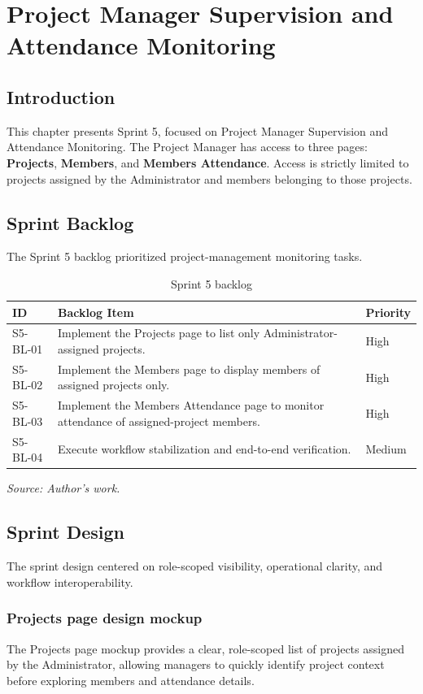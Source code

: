 \chapter{Project Manager Supervision and Attendance Monitoring}
\minitoc
\clearpage
\section{Introduction}
This chapter presents Sprint 5, focused on Project Manager Supervision and Attendance Monitoring. The Project Manager has access to three pages: \textbf{Projects}, \textbf{Members}, and \textbf{Members Attendance}. Access is strictly limited to projects assigned by the Administrator and members belonging to those projects.

\section{Sprint Backlog}
The Sprint 5 backlog prioritized project-management monitoring tasks.
\begin{table}[H]
\centering
\renewcommand{\arraystretch}{1.2}
\begin{tabular}{|l|>{\raggedright\arraybackslash}p{10.2cm}|l|}
\hline
\textbf{ID} & \textbf{Backlog Item} & \textbf{Priority} \\
\hline
S5-BL-01 & Implement the Projects page to list only Administrator-assigned projects. & High \\
\hline
S5-BL-02 & Implement the Members page to display members of assigned projects only. & High \\
\hline
S5-BL-03 & Implement the Members Attendance page to monitor attendance of assigned-project members. & High \\
\hline
S5-BL-04 & Execute workflow stabilization and end-to-end verification. & Medium \\
\hline
\end{tabular}
\caption{Sprint 5 backlog}
\label{tab:sprint-5-backlog}
{\footnotesize\textit{Source: Author's work.}}
\end{table}

\section{Sprint Design}
The sprint design centered on role-scoped visibility, operational clarity, and workflow interoperability.

\subsection{Projects page design mockup}
The Projects page mockup provides a clear, role-scoped list of projects assigned by the Administrator, allowing managers to quickly identify project context before exploring members and attendance details.

